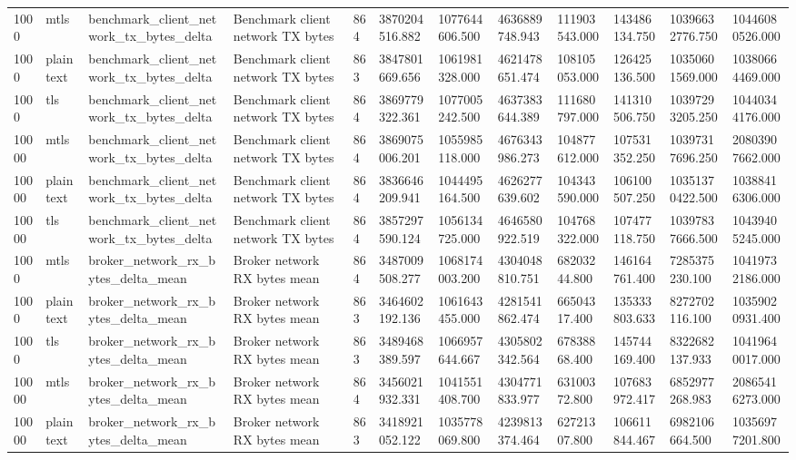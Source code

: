 \begin{longtable}{llllllllllll}
1000 & mtls & benchmark\_client\_network\_tx\_bytes\_delta & Benchmark client network TX bytes & 864 & 3870204516.882 & 1077644606.500 & 4636889748.943 & 111903543.000 & 143486134.750 & 10396632776.750 & 10446080526.000 \\
1000 & plaintext & benchmark\_client\_network\_tx\_bytes\_delta & Benchmark client network TX bytes & 863 & 3847801669.656 & 1061981328.000 & 4621478651.474 & 108105053.000 & 126425136.500 & 10350601569.000 & 10380664469.000 \\
1000 & tls & benchmark\_client\_network\_tx\_bytes\_delta & Benchmark client network TX bytes & 864 & 3869779322.361 & 1077005242.500 & 4637383644.389 & 111680797.000 & 141310506.750 & 10397293205.250 & 10440344176.000 \\
10000 & mtls & benchmark\_client\_network\_tx\_bytes\_delta & Benchmark client network TX bytes & 864 & 3869075006.201 & 1055985118.000 & 4676343986.273 & 104877612.000 & 107531352.250 & 10397317696.250 & 20803907662.000 \\
10000 & plaintext & benchmark\_client\_network\_tx\_bytes\_delta & Benchmark client network TX bytes & 864 & 3836646209.941 & 1044495164.500 & 4626277639.602 & 104343590.000 & 106100507.250 & 10351370422.500 & 10388416306.000 \\
10000 & tls & benchmark\_client\_network\_tx\_bytes\_delta & Benchmark client network TX bytes & 864 & 3857297590.124 & 1056134725.000 & 4646580922.519 & 104768322.000 & 107477118.750 & 10397837666.500 & 10439405245.000 \\
1000 & mtls & broker\_network\_rx\_bytes\_delta\_mean & Broker network RX bytes mean & 864 & 3487009508.277 & 1068174003.200 & 4304048810.751 & 68203244.800 & 146164761.400 & 7285375230.100 & 10419732186.000 \\
1000 & plaintext & broker\_network\_rx\_bytes\_delta\_mean & Broker network RX bytes mean & 863 & 3464602192.136 & 1061643455.000 & 4281541862.474 & 66504317.400 & 135333803.633 & 8272702116.100 & 10359020931.400 \\
1000 & tls & broker\_network\_rx\_bytes\_delta\_mean & Broker network RX bytes mean & 863 & 3489468389.597 & 1066957644.667 & 4305802342.564 & 67838868.400 & 145744169.400 & 8322682137.933 & 10419640017.000 \\
10000 & mtls & broker\_network\_rx\_bytes\_delta\_mean & Broker network RX bytes mean & 864 & 3456021932.331 & 1041551408.700 & 4304771833.977 & 63100372.800 & 107683972.417 & 6852977268.983 & 20865416273.000 \\
10000 & plaintext & broker\_network\_rx\_bytes\_delta\_mean & Broker network RX bytes mean & 863 & 3418921052.122 & 1035778069.800 & 4239813374.464 & 62721307.800 & 106611844.467 & 6982106664.500 & 10356977201.800 \\

\end{longtable}
